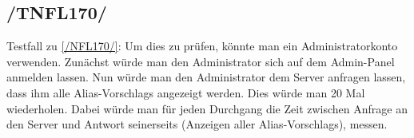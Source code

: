\subsection*{/TNFL170/}
\label{/TNFL170/} Testfall zu \ref{/NFL170/}: Um dies zu prüfen, könnte man ein \Gls{Administrator}konto verwenden. Zunächst würde man den \Gls{Administrator} sich auf dem \Gls{Admin-Panel} anmelden lassen. Nun würde man den \Gls{Administrator} dem \Gls{Server} anfragen lassen, dass ihm alle \Glspl{Alias-Vorschlag} angezeigt werden. Dies würde man 20 Mal wiederholen. Dabei würde man für jeden Durchgang die Zeit zwischen Anfrage an den \Gls{Server} und Antwort seinerseits (Anzeigen aller \Glspl{Alias-Vorschlag}), messen.